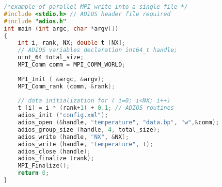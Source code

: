 \begin{lstlisting}[language=C,caption={ADIOS programming example.},label={list-adios-prog-example}]
/*example of parallel MPI write into a single file */ 
#include <stdio.h> // ADIOS header file required 
#include "adios.h"
int main (int argc, char *argv[])
{
	int i, rank, NX; double t [NX];
	// ADIOS variables declaration int64_t handle;
	uint_64 total_size;
	MPI_Comm comm = MPI_COMM_WORLD; 
	
	MPI_Init ( &argc, &argv);
	MPI_Comm_rank (comm, &rank);
	
	// data initialization for ( i=0; i<NX; i++)
	t [i] = i * (rank+1) + 0.1; // ADIOS routines 
	adios_init ("config.xml");
	adios_open (&handle, "temperature", "data.bp", "w",&comm); 
	adios_group_size (handle, 4, total_size);
	adios_write (handle, "NX", &NX);
	adios_write (handle, "temperature", t); 
	adios_close (handle);
	adios_finalize (rank);
	MPI_Finalize(); 
	return 0;
}
\end{lstlisting}
